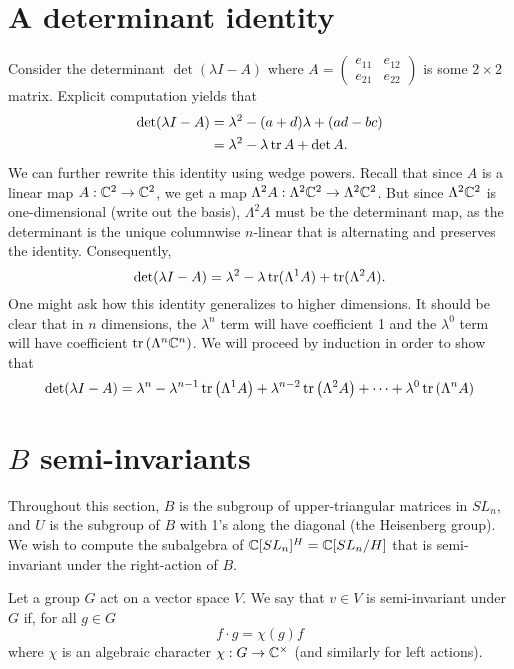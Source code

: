 \documentclass{../mathnotes}
\begin{document}
\section{A determinant identity}

Consider the determinant $\det\left( \lambda I-A \right)$ where $A=\left(\begin{smallmatrix}e_{11} & e_{12}\\e_{21}&e_{22}\end{smallmatrix}\right)$
is some $2\times 2$ matrix. Explicit computation yields that
\begin{align*}
    \det(\lambda I-A)&=\lambda^2-(a+d)\lambda+(ad-bc)\\
    &=\lambda^2-\lambda\operatorname{tr} A + \det A.
\end{align*}
We can further rewrite this identity using wedge powers. Recall that since $A$ is a linear map $A:\mathbb{C}^2\to\mathbb{C}^2$, we get
a map $\Lambda^2 A:\Lambda^2\mathbb{C}^2\to\Lambda^2\mathbb{C}^2$. But since $\Lambda^2\mathbb{C}^2$ is one-dimensional (write out the basis),
$\Lambda^2 A$ must be the determinant map, as the determinant is the unique columnwise $n$-linear that is alternating and
preserves the identity. Consequently,
\[ \det(\lambda I-A)=\lambda^2-\lambda\operatorname{tr}(\Lambda^1A)+\operatorname{tr}(\Lambda^2A). \]
One might ask how this identity generalizes to higher dimensions. It should be clear that in $n$ dimensions, the $\lambda^n$ term
will have coefficient 1 and the $\lambda^0$ term will have coefficient $\operatorname{tr}\left(\Lambda^n\mathbb{C}^n\right)$. We will proceed by induction
in order to show that
\[\det(\lambda I-A)=\lambda^n-\lambda^{n-1}\operatorname{tr}\left( \Lambda^1A \right)+\lambda^{n-2}\operatorname{tr}\left( \Lambda^2A \right)+\cdots+\lambda^0\operatorname{tr}\left(\Lambda^nA\right)\]


\section{$B$ semi-invariants}

Throughout this section, $B$ is the subgroup of upper-triangular matrices in $SL_n$, and $U$ is the subgroup of $B$ with
1's along the diagonal (the Heisenberg group). We wish to compute the subalgebra of $\mathbb{C}[SL_n]^H=\mathbb{C}[SL_n/H]$ that is semi-invariant
under the right-action of $B$. 

\begin{defn}
    Let a group $G$ act on a vector space $V$. We say that $v\in V$ is semi-invariant under $G$ if, for all $g\in G$
    \[f\cdot g=\chi(g) f\]
    where $\chi$ is an algebraic character $\chi:G\to\mathbb{C}^\times$ (and similarly for left actions).
\end{defn}
\end{document}
